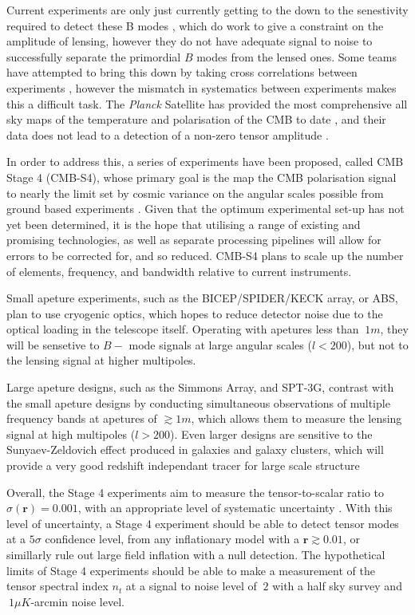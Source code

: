 Current experiments are only just currently getting to the down to the senestivity required to detect these B modes  \cite{1412.0626} \cite{1307.5830} \cite{1403.2369}, which do work to give a constraint on the amplitude of lensing, however they do not have adequate signal to noise to successfully separate the primordial $B$ modes from the lensed ones. Some teams have attempted to bring this down by taking cross correlations between experiments \cite{1502.00612}, however the mismatch in systematics between experiments makes this a difficult task. The \textit{Planck} Satellite has provided the most comprehensive all sky maps of the temperature and polarisation of the CMB to date \cite{1807.06205}, and their data does not lead to a detection of a non-zero tensor amplitude \cite{1807.06211}. 

\par In order to address this, a series of experiments have been proposed, called CMB Stage 4 (CMB-S4), whose primary goal is the map the CMB polarisation signal to nearly the limit set by cosmic variance on the angular scales possible from ground based experiments \cite{1610.02743}. Given that the optimum experimental set-up has not yet been determined, it is the hope that utilising a range of existing and promising technologies, as well as separate processing pipelines will allow for errors to be corrected for, and so reduced. CMB-S4 plans to scale up the number of elements, frequency, and bandwidth relative to current instruments. 

\par Small apeture experiments, such as the BICEP/SPIDER/KECK array, or ABS, plan to use cryogenic optics, which hopes to reduce detector noise due to the optical loading in the telescope itself. Operating with apetures less than $~ 1 m$, they will be sensetive to $B-$ mode signals at large angular scales ($l<200$), but not to the lensing signal at higher multipoles. 

\par Large apeture designs, such as the Simmons Array, and SPT-3G, contrast with the small apeture designs by conducting simultaneous observations of multiple frequency bands at apetures of $\gtrsim 1 m $, which allows them to measure the lensing signal at high multipoles ($l>200$). Even larger designs are sensitive to the Sunyaev-Zeldovich effect produced in galaxies and galaxy clusters, which will provide a very good redshift independant tracer for large scale structure \cite{math/0208192} 

\par Overall, the Stage 4 experiments aim to measure the tensor-to-scalar ratio to $\sigma(\textbf{r}) = 0.001$, with an appropriate level of systematic uncertainty \cite{1309.5381}. With this level of uncertainty, a Stage 4 experiment should be able to detect tensor modes at a $5\sigma$ confidence level, from any inflationary model with a $\textbf{r}\gtrsim 0.01$, or simillarly rule out large field inflation with a null detection. The hypothetical limits of Stage 4 experiments should be able to make a measurement of the tensor spectral index $n_t$ at a signal to noise level of $~2$ with a half sky survey and $~1 \mu K$-arcmin noise level.  

